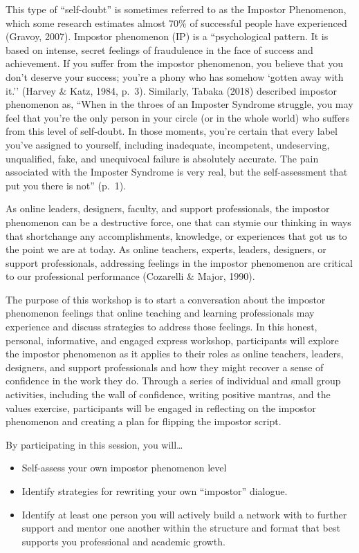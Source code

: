 \documentclass[]{article}
\providecommand{\tightlist}{%
  \setlength{\itemsep}{0pt}\setlength{\parskip}{0pt}}
\begin{document}
This type of ``self-doubt'' is sometimes referred to as the Impostor
Phenomenon, which some research estimates almost 70\% of successful
people have experienced (Gravoy, 2007). Impostor phenomenon (IP) is a
``psychological pattern. It is based on intense, secret feelings of
fraudulence in the face of success and achievement. If you suffer from
the impostor phenomenon, you believe that you don't deserve your
success; you're a phony who has somehow `gotten away with it.'' (Harvey
\& Katz, 1984, p.~3). Similarly, Tabaka (2018) described impostor
phenomenon as, ``When in the throes of an Imposter Syndrome struggle,
you may feel that you're the only person in your circle (or in the whole
world) who suffers from this level of self-doubt. In those moments,
you're certain that every label you've assigned to yourself, including
inadequate, incompetent, undeserving, unqualified, fake, and unequivocal
failure is absolutely accurate. The pain associated with the Imposter
Syndrome is very real, but the self-assessment that put you there is
not'' (p.~1).

As online leaders, designers, faculty, and support professionals, the
impostor phenomenon can be a destructive force, one that can stymie our
thinking in ways that shortchange any accomplishments, knowledge, or
experiences that got us to the point we are at today. As online
teachers, experts, leaders, designers, or support professionals,
addressing feelings in the impostor phenomenon are critical to our
professional performance (Cozarelli \& Major, 1990).

The purpose of this workshop is to start a conversation about the
impostor phenomenon feelings that online teaching and learning
professionals may experience and discuss strategies to address those
feelings. In this honest, personal, informative, and engaged express
workshop, participants will explore the impostor phenomenon as it
applies to their roles as online teachers, leaders, designers, and
support professionals and how they might recover a sense of confidence
in the work they do. Through a series of individual and small group
activities, including the wall of confidence, writing positive mantras,
and the values exercise, participants will be engaged in reflecting on
the impostor phenomenon and creating a plan for flipping the impostor
script.

By participating in this session, you will\ldots{}

\begin{itemize}
\tightlist
\item
  Self-assess your own impostor phenomenon level
\item
  Identify strategies for rewriting your own ``impostor'' dialogue.
\item
  Identify at least one person you will actively build a network with to
  further support and mentor one another within the structure and format
  that best supports you professional and academic growth.
\end{itemize}
\end{document}
